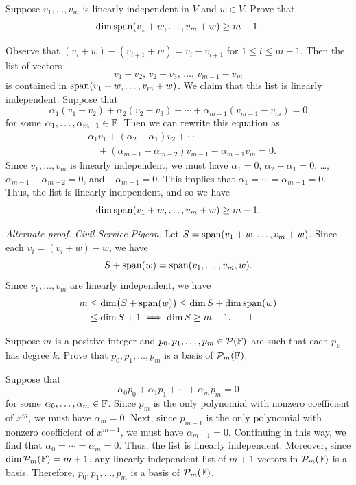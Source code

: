 \begin{exc}
\begin{exercise}
Suppose $v_1,\dots,v_m$ is linearly independent in $V$ and $w\in V$. Prove that
\[ \operatorname{dim}\operatorname{span}(v_1+w,\dots,v_m+w) \ge m-1. \]
\end{exercise}
\begin{solution}
Observe that $(v_i+w)-(v_{i+1}+w)=v_i-v_{i+1}$ for $1\le i\le m-1$. Then the
list of vectors
\[ v_1-v_2,\,v_2-v_3,\,\dots,\,v_{m-1}-v_m \]
is contained in $\operatorname{span}(v_1+w,\dots,v_m+w)$. We claim that this list is linearly
independent. Suppose that
\[ \alpha_1(v_1-v_2)+\alpha_2(v_2-v_3)+\cdots+\alpha_{m-1}(v_{m-1}-v_m) = 0 \]
for some $\alpha_1,\dots,\alpha_{m-1}\in\mathbb{F}$. Then we can rewrite this equation
as
\begin{align*}
&\alpha_1v_1+(\alpha_2-\alpha_1)v_2+\cdots\\
&\quad+(\alpha_{m-1}-\alpha_{m-2})v_{m-1}-\alpha_{m-1}v_m = 0.
\end{align*}
Since $v_1,\dots,v_m$ is linearly independent, we must have $\alpha_1=0$,
$\alpha_2-\alpha_1=0$, \dots, $\alpha_{m-1}-\alpha_{m-2}=0$, and
$-\alpha_{m-1}=0$. This implies that $\alpha_1=\cdots=\alpha_{m-1}=0$. Thus, the
list is linearly independent, and so we have
\[ \operatorname{dim}\operatorname{span}(v_1+w,\dots,v_m+w) \ge m-1. \]

\emph{Alternate proof.} \emph{Civil Service Pigeon.} Let
$S=\operatorname{span}(v_1+w,\dots,v_m+w)$. Since each $v_i=(v_i+w)-w$, we have
\[ S+\operatorname{span}(w) = \operatorname{span}(v_1,\dots,v_m,w). \]
Since $v_1,\dots,v_m$ are linearly independent, we have
\begin{align*}
m &\le \operatorname{dim}\bigl(S+\operatorname{span}(w)\bigr) \le \operatorname{dim} S+\operatorname{dim}\operatorname{span}(w)\\
  &\le \operatorname{dim} S+1 \implies \operatorname{dim} S\ge m-1. \qedhere
\end{align*}
\end{solution}

\begin{exercise}
Suppose $m$ is a positive integer and $p_0,p_1,\dots,p_m\in\mathcal{P}(\mathbb{F})$ are such
that each $p_k$ has degree $k$. Prove that $p_0,p_1,\dots,p_m$ is a basis of
$\mathcal{P}_m(\mathbb{F})$.
\end{exercise}
\begin{solution}
Suppose that
\[ \alpha_0p_0+\alpha_1p_1+\cdots+\alpha_mp_m = 0 \]
for some $\alpha_0,\dots,\alpha_m\in\mathbb{F}$. Since $p_m$ is the only polynomial with
nonzero coefficient of $x^m$, we must have $\alpha_m=0$. Next, since $p_{m-1}$
is the only polynomial with nonzero coefficient of $x^{m-1}$, we must have
$\alpha_{m-1}=0$. Continuing in this way, we find that
$\alpha_0=\cdots=\alpha_m=0$. Thus, the list is linearly independent. Moreover,
since $\operatorname{dim}\mathcal{P}_m(\mathbb{F})=m+1$, any linearly independent list of $m+1$ vectors in
$\mathcal{P}_m(\mathbb{F})$ is a basis. Therefore, $p_0,p_1,\dots,p_m$ is a basis of
$\mathcal{P}_m(\mathbb{F})$.
\end{solution}


\end{exc}
